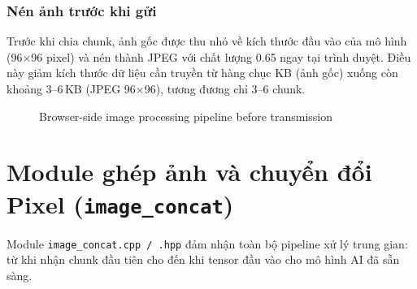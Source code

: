 \documentclass[12pt,a4paper]{article}
\begin{document}
\subsubsection*{Nén ảnh trước khi gửi}

Trước khi chia chunk, ảnh gốc được thu nhỏ về kích thước đầu vào của mô hình (96×96 pixel) và nén thành JPEG với chất lượng 0.65 ngay tại trình duyệt. Điều này giảm kích thước dữ liệu cần truyền từ hàng chục KB (ảnh gốc) xuống còn khoảng 3--6\,KB (JPEG 96×96), tương đương chỉ 3--6 chunk.

\begin{figure}[H]
\centering
{}
\caption{Browser-side image processing pipeline before transmission}
\end{figure}

\section{Module ghép ảnh và chuyển đổi Pixel (\texttt{image\_concat})}

Module \texttt{image\_concat.cpp / .hpp} đảm nhận toàn bộ pipeline xử lý trung gian: từ khi nhận chunk đầu tiên cho đến khi tensor đầu vào cho mô hình AI đã sẵn sàng.
\end{document}
